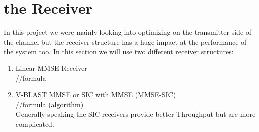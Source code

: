 \section{the Receiver}
In this project we were mainly looking into optimizing on the transmitter side of the channel but the receiver structure has a huge impact at the performance of the system too.
In this section we will use two different receiver structures:
\begin{enumerate}
	\item Linear MMSE Receiver\\
	//formula
	\item V-BLAST MMSE or SIC with MMSE (MMSE-SIC)\\
	//formula (algorithm)\\
	Generally speaking the SIC receivers provide better Throughput but are more complicated.
\end{enumerate}

